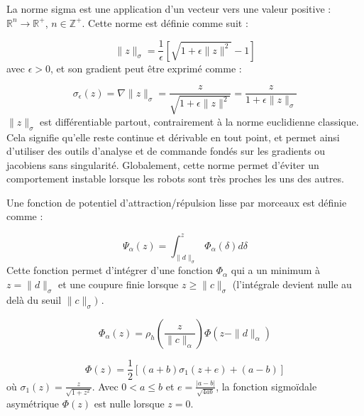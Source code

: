 La norme sigma est une application d'un vecteur vers une valeur positive : $\mathbb{R}^n \to \mathbb{R}^+$, $n \in \mathbb{Z}^+$. Cette norme est définie comme suit :

\begin{equation}
\|z\|_\sigma = \frac{1}{\epsilon}\left[\sqrt{1 + \epsilon\|z\|^2} - 1\right] \tag{2.15}
\end{equation}
avec $\epsilon > 0$, et son gradient peut être exprimé comme :

\begin{equation}
\sigma_\epsilon(z) = \nabla\|z\|_\sigma = \frac{z}{\sqrt{1 + \epsilon\|z\|^2}} = \frac{z}{1 + \epsilon\|z\|_\sigma} \tag{2.16}
\end{equation}
$\|z\|_\sigma$ est différentiable partout, contrairement à la norme euclidienne classique. Cela signifie qu'elle reste continue et dérivable en tout point, et permet ainsi d'utiliser des outils d'analyse et de commande fondés sur les gradients ou jacobiens sans singularité. Globalement, cette norme permet d'éviter un comportement instable lorsque les robots sont très proches les uns des autres.

\noindent Une fonction de potentiel d'attraction/répulsion lisse par morceaux est définie comme :

\begin{equation}
  \Psi_{\alpha}(z) = \int_{\|d\|_{\sigma}}^{z} \Phi_{\alpha}(\delta) d\delta 
\end{equation}
Cette fonction permet d'intégrer d'une fonction \(\Phi_{\alpha}\) qui a un minimum à \(z = \|d\|_{\sigma}\) et une coupure finie lorsque \(z \geq \|c\|_{\sigma}\) (l'intégrale devient nulle au delà du seuil $\|c\|_{\sigma})$ . 


\begin{equation}
\Phi_{\alpha}(z) = \rho_h\left(\frac{z}{\|c\|_{\alpha}}\right) \Phi(z - \|d\|_{\alpha})    
\end{equation}

\begin{equation}
\Phi(z) = \frac{1}{2} \left[ (a + b) \sigma_1(z + e) + (a - b) \right]
\end{equation}
où \(\sigma_1(z) = \frac{z}{\sqrt{1 + z^2}}\).
Avec \(0 < a \leq b\) et \(e = \frac{|a - b|}{\sqrt{4ab}}\), la fonction sigmoïdale asymétrique \(\Phi(z)\) est nulle lorsque \(z = 0\).